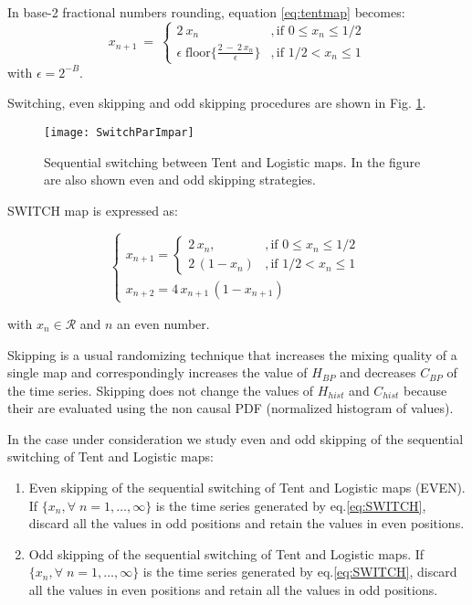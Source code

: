 In base-2 fractional numbers rounding, equation \ref{eq:tentmap} becomes:
\begin{equation}\label{eq:tentdecbin}
x_{n+1}~=~ \left\{ \begin{array}{ll}
2~{x_n} &, \textrm{if $0\leq x_n\leq 1/2$}\\
\epsilon \; \text{floor}\{\frac{2~-~2~x_n}{\epsilon}\} &, \textrm{if $1/2<x_n\leq 1$} 
\end{array} \right. 
\end{equation}
with $\epsilon=2^{-B}$.

Switching, even skipping and odd skipping procedures are shown in Fig. \ref{fig:seq}.

\begin{figure}[htpb]
\centering	
	\texttt{[image: SwitchParImpar]}
	\caption{Sequential switching between Tent and Logistic maps. In the figure are also shown even and odd skipping strategies.} \label{fig:seq}
\end{figure}

SWITCH map is expressed as:

\begin{equation}
\begin{cases}
x_{n+1}=
\begin{cases}
2\,x_n, &, \mbox{if } 0\leq x_n\leq 1/2 \\
2\,(1-x_n ) &, \mbox{if } 1/2<x_n\leq 1
\end{cases} \\
x_{n+2}=4\,x_{n+1}\,(1-x_{n+1})
\end{cases}\label{eq:SWITCH}
\end{equation}

\noindent with $x_n\in\mathcal{R}$ and $n$ an even number.

Skipping is a usual randomizing technique that increases the mixing quality of a single map and correspondingly increases the value of $H_{BP}$ and decreases $C_{BP} $ of the time series.
Skipping does not change the values of $H_{hist}$ and $C_{hist}$ because their are evaluated using the non causal PDF (normalized histogram of values)\cite{DeMicco2008}.

In the case under consideration we study even and odd skipping of the sequential switching of Tent and Logistic maps:
\begin{enumerate}
	\item Even skipping of the sequential switching of Tent and Logistic maps (EVEN).\\
	If $\{x_n,\forall \; n=1,\dots,\infty\}$ is the time series generated by eq.\ref{eq:SWITCH}, discard all the values in odd positions and retain the values in even positions.
	\item Odd skipping of the sequential switching of Tent and Logistic maps.
	If $\{x_n, \forall \; n=1,\dots,\infty\}$ is the time series generated by eq.\ref{eq:SWITCH}, discard all the values in even positions and retain all the values in odd positions.
\end{enumerate}


